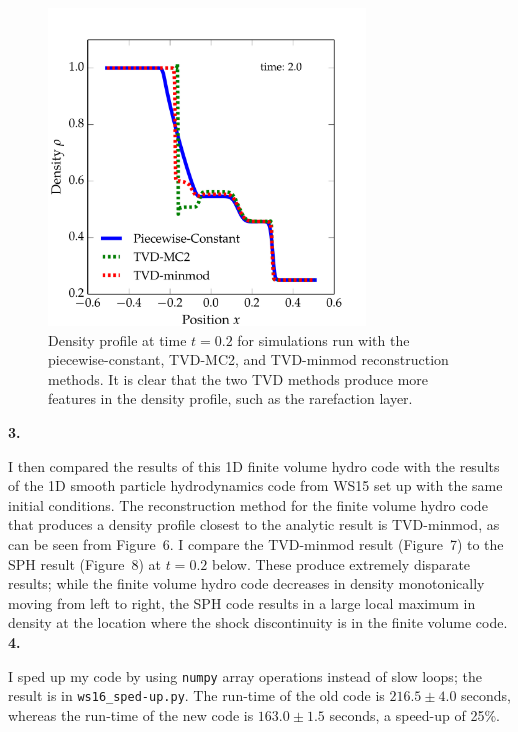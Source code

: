\documentclass{article}
\begin{document}
\begin{spacing}{1.1}
\begin{figure}[H]
 \centering
 \hspace{0cm} \includegraphics[width=0.75\textwidth]{comparison.pdf}
 \caption{Density profile at time \(t = 0.2\) for simulations run with the piecewise-constant, TVD-MC2, and TVD-minmod reconstruction methods. It is clear that the two TVD methods produce more features in the density profile, such as the rarefaction layer.}
\end{figure}

\noindent \textbf{3.}

I then compared the results of this 1D finite volume hydro code with the results of the 1D smooth particle hydrodynamics code from WS15 set up with the same initial conditions. The reconstruction method for the finite volume hydro code that produces a density profile closest to the analytic result is TVD-minmod, as can be seen from Figure~6. I compare the TVD-minmod result (Figure~7) to the SPH result (Figure~8) at \(t = 0.2\) below. These produce extremely disparate results; while the finite volume hydro code decreases in density monotonically moving from left to right, the SPH code results in a large local maximum in density at the location where the shock discontinuity is in the finite volume code. \\

\noindent \textbf{4.}

I sped up my code by using \texttt{numpy} array operations instead of slow loops; the result is in \texttt{ws16\_sped-up.py}. The run-time of the old code is \(216.5 \pm 4.0\) seconds, whereas the run-time of the new code is \(163.0 \pm 1.5\) seconds, a speed-up of 25\%.


\end{spacing}
\end{document}
